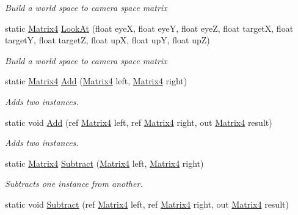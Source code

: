 \begin{DoxyCompactItemize}
\begin{DoxyCompactList}\small\item\em Build a world space to camera space matrix \end{DoxyCompactList}\item 
static \hyperlink{struct_open_t_k_1_1_matrix4}{Matrix4} \hyperlink{struct_open_t_k_1_1_matrix4_af34d6b9a60fdeeb9b2324a720c954162}{Look\-At} (float eye\-X, float eye\-Y, float eye\-Z, float target\-X, float target\-Y, float target\-Z, float up\-X, float up\-Y, float up\-Z)
\begin{DoxyCompactList}\small\item\em Build a world space to camera space matrix \end{DoxyCompactList}\item 
static \hyperlink{struct_open_t_k_1_1_matrix4}{Matrix4} \hyperlink{struct_open_t_k_1_1_matrix4_aebe1447b4092723aaf6ff75aa547cc61}{Add} (\hyperlink{struct_open_t_k_1_1_matrix4}{Matrix4} left, \hyperlink{struct_open_t_k_1_1_matrix4}{Matrix4} right)
\begin{DoxyCompactList}\small\item\em Adds two instances. \end{DoxyCompactList}\item 
static void \hyperlink{struct_open_t_k_1_1_matrix4_ada6c12bead9854fe53fcf0ba6dc6eb31}{Add} (ref \hyperlink{struct_open_t_k_1_1_matrix4}{Matrix4} left, ref \hyperlink{struct_open_t_k_1_1_matrix4}{Matrix4} right, out \hyperlink{struct_open_t_k_1_1_matrix4}{Matrix4} result)
\begin{DoxyCompactList}\small\item\em Adds two instances. \end{DoxyCompactList}\item 
static \hyperlink{struct_open_t_k_1_1_matrix4}{Matrix4} \hyperlink{struct_open_t_k_1_1_matrix4_ae93d59e9897a688ff81dc0d132600f67}{Subtract} (\hyperlink{struct_open_t_k_1_1_matrix4}{Matrix4} left, \hyperlink{struct_open_t_k_1_1_matrix4}{Matrix4} right)
\begin{DoxyCompactList}\small\item\em Subtracts one instance from another. \end{DoxyCompactList}\item 
static void \hyperlink{struct_open_t_k_1_1_matrix4_a074be83f6c2ca23aa31740cebf52ece7}{Subtract} (ref \hyperlink{struct_open_t_k_1_1_matrix4}{Matrix4} left, ref \hyperlink{struct_open_t_k_1_1_matrix4}{Matrix4} right, out \hyperlink{struct_open_t_k_1_1_matrix4}{Matrix4} result)

\end{DoxyCompactItemize}
